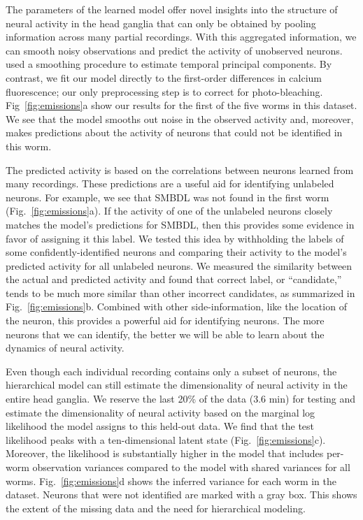 \documentclass[11pt]{article}
\begin{document}
The parameters of the learned model offer novel insights into the
structure of neural activity in the head ganglia that can only be
obtained by pooling information across many partial recordings.  With
this aggregated information, we can smooth noisy observations and
predict the activity of unobserved neurons. \citet{kato2015global}
used a smoothing procedure to estimate temporal principal components.
By contrast, we fit our model directly to the first-order differences
in calcium fluorescence; our only preprocessing step is to correct for
photo-bleaching. Fig~\ref{fig:emissions}a show our results for the first
of the five worms in this dataset. We see that the model smooths out
noise in the observed activity and, moreover, makes predictions about
the activity of neurons that could not be identified in this worm.

The predicted activity is based on the correlations between neurons
learned from many recordings.  These predictions are a useful aid for
identifying unlabeled neurons.  For example, we see that
\textsf{SMBDL} was not found in the first worm
(Fig.~\ref{fig:emissions}a). If the activity of one of the unlabeled
neurons closely matches the model's predictions for \textsf{SMBDL},
then this provides some evidence in favor of assigning it this
label. We tested this idea by withholding the labels of some
confidently-identified neurons and comparing their activity to the
model's predicted activity for all unlabeled neurons.  We measured the
similarity between the actual and predicted activity and found that
correct label, or ``candidate,'' tends to be much more similar than
other incorrect candidates, as summarized in
Fig.~\ref{fig:emissions}b.  Combined with other side-information, like
the location of the neuron, this provides a powerful aid for identifying
neurons.  The more neurons that we can identify, the better we will be
able to learn about the dynamics of neural activity.

Even though each individual recording contains only a subset of neurons,
the hierarchical model can still estimate the dimensionality of
neural activity in the entire head ganglia.  We reserve the last 20\% of
the data (3.6 min) for testing and estimate the dimensionality
of neural activity based on the marginal log likelihood the model assigns
to this held-out data. We find that the test likelihood peaks with a
ten-dimensional latent state (Fig.~\ref{fig:emissions}c).  Moreover, the likelihood is substantially
higher in the model that includes per-worm observation variances
compared to the model with shared variances for all worms. Fig.~\ref{fig:emissions}d
shows the inferred variance for each worm in the \citet{kato2015global}
dataset.  Neurons that were not identified are marked with a gray box.
This shows the extent of the missing data and the need for hierarchical
modeling.
\end{document}

